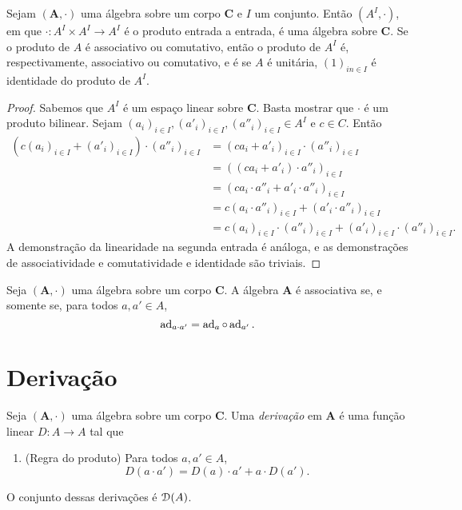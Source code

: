 \begin{proposition}
Sejam $(\bm A,\cdot)$ uma álgebra sobre um corpo $\bm C$ e $I$ um conjunto. Então $(A^I,\cdot)$, em que $\cdot\colon A^I \times A^I \to A^I$ é o produto entrada a entrada, é uma álgebra sobre $\bm C$. Se o produto de $A$ é associativo ou comutativo, então o produto de $A^I$ é, respectivamente, associativo ou comutativo, e é se $A$ é unitária, $(1)_{in \in I}$ é identidade do produto de $A^I$.
\end{proposition}
\begin{proof}
Sabemos que $A^I$ é um espaço linear sobre $\bm C$. Basta mostrar que $\cdot$ é um produto bilinear. Sejam $(a_i)_{i \in I},(a'_i)_{i \in I},(a''_i)_{i \in I} \in A^I$ e $c \in C$. Então
	\begin{align*}
	(c(a_i)_{i \in I} + (a'_i)_{i \in I}) \cdot (a''_i)_{i \in I} &= (ca_i + a'_i)_{i \in I} \cdot (a''_i)_{i \in I} \\
	&= ((ca_i + a'_i) \cdot a''_i)_{i \in I} \\
	&= (ca_i \cdot a''_i + a'_i \cdot a''_i)_{i \in I} \\
	&= c(a_i \cdot a''_i)_{i \in I} + (a'_i \cdot a''_i)_{i \in I} \\
	&= c(a_i)_{i \in I} \cdot (a''_i)_{i \in I} + (a'_i)_{i \in I} \cdot (a''_i)_{i \in I}.
	\end{align*}
A demonstração da linearidade na segunda entrada é análoga, e as demonstrações de associatividade e comutatividade e identidade são triviais.
\end{proof}

\begin{proposition}
Seja $(\bm A,\cdot)$ uma álgebra sobre um corpo $\bm C$. A álgebra $\bm A$ é associativa se, e somente se, para todos $a,a' \in A$,
	\begin{equation*}
	\operatorname{ad}_{a \cdot a'} = \operatorname{ad}_a \circ \operatorname{ad}_{a'}.
	\end{equation*}
\end{proposition}

\section{Derivação}

\begin{definition}
Seja $(\bm A,\cdot)$ uma álgebra sobre um corpo $\bm C$. Uma \emph{derivação} em $\bm A$ é uma função linear $D\colon A \to A$ tal que
	\begin{enumerate}
	\item (Regra do produto) Para todos $a,a' \in A$,
		\begin{equation*}
		D(a \cdot a') = D(a) \cdot a' + a \cdot D(a').
		\end{equation*}
	\end{enumerate}
O conjunto dessas derivações é $\mathcal{D}(A)$.
\end{definition}

